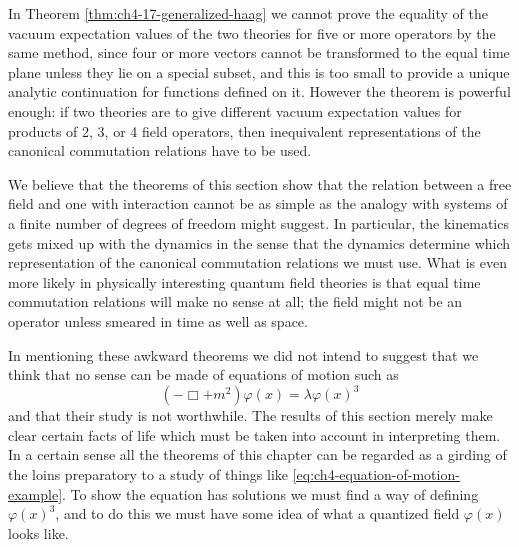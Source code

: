 In Theorem \ref{thm:ch4-17-generalized-haag} we cannot prove the equality of the vacuum expectation values
of the two theories for five or more operators by the same method, since four
or more vectors cannot be transformed to the equal time plane unless they lie
on a special subset, and this is too small to provide a unique analytic
continuation for functions defined on it.  However the theorem is powerful
enough: if two theories are to give different vacuum expectation values for
products of 2, 3, or 4 field operators, then inequivalent representations of
the canonical commutation relations have to be used.

We believe that the theorems of this section show that the relation between a
free field and one with interaction cannot be as simple as the analogy with
systems of a finite number of degrees of freedom might suggest.  In particular,
the kinematics gets mixed up with the dynamics in the sense that the dynamics
determine which representation of the canonical commutation relations we must
use.  What is even more likely in physically interesting quantum field theories
is that equal time commutation relations will make no sense at all; the field
might not be an operator unless smeared in time as well as space.

In mentioning these awkward theorems we did not intend to suggest that we think
that no sense can be made of equations of motion such as
\begin{equation}
  (-\Box+m^2)\varphi(x)=\lambda\varphi(x)^3
  \tag{4-89}\label{eq:ch4-equation-of-motion-example}
\end{equation}
and that their study is not worthwhile.  The results of this section merely make
clear certain facts of life which must be taken into account in interpreting
them.  In a certain sense all the theorems of this chapter can be regarded as a
girding of the loins preparatory to a study of things like \eqref{eq:ch4-equation-of-motion-example}.  To show the
equation has solutions we must find a way of defining $\varphi(x)^3$, and to do
this we must have some idea of what a quantized field $\varphi(x)$ looks like.
